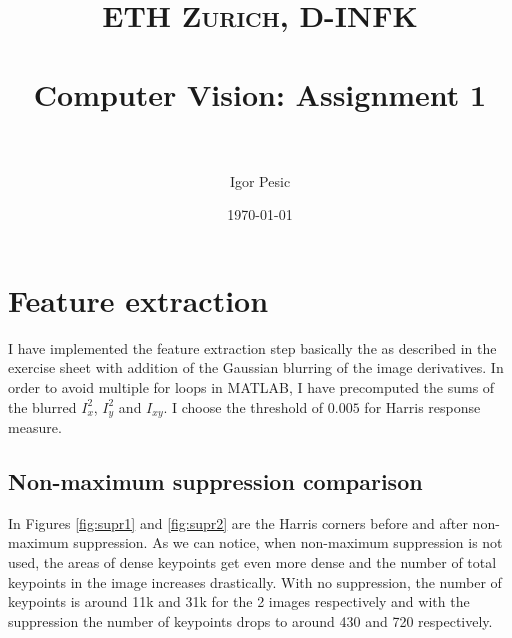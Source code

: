\documentclass[paper=a4, fontsize=11pt]{scrartcl} %
\title{	
\normalfont \normalsize 
\textsc{ETH Zurich, D-INFK} \\ [25pt] %
\horrule{0.5pt} \\[0.4cm] %
\huge Computer Vision: Assignment 1 \\ %
\horrule{2pt} \\[0.5cm] %
}
\author{Igor Pesic} %
\date{\normalsize\today} %
\numberwithin{equation}{section} %
\numberwithin{figure}{section} %
\numberwithin{table}{section} %
\begin{document}
\maketitle %


\section{Feature extraction}


I have implemented the  feature extraction step basically the as described in the exercise sheet with addition of the Gaussian blurring of the image derivatives. In order to avoid multiple for loops in MATLAB, I have precomputed the sums of the blurred  $I_{x}^2$, $I_{y}^2$ and $I_{xy}$. I choose the threshold of $0.005$ for Harris response measure. 


\subsection{Non-maximum suppression comparison}

In Figures \ref{fig:supr1} and \ref{fig:supr2} are the Harris corners before and after non-maximum suppression. As we can notice, when non-maximum suppression is not used, the areas of dense keypoints get even more dense and the number of total keypoints in the image increases drastically. With no suppression, the number of keypoints is around 11k and 31k for the 2 images respectively and with the suppression the number of keypoints drops to around 430 and 720 respectively.
\end{document}
